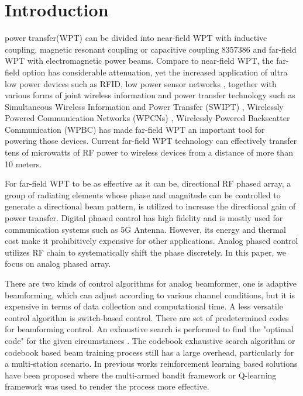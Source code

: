 










\section{Introduction}
 power transfer(WPT) can be divided into near-field WPT with inductive coupling, magnetic resonant coupling or capacitive coupling {8357386} and far-field WPT with electromagnetic power beams. \cite{8246215} Compare to near-field WPT, the far-field option has considerable attenuation,  yet the increased application of ultra low power devices such as RFID, low power sensor networks \cite{7578025}, together with various forms of joint wireless information and power transfer technology such as Simultaneous Wireless Information and Power Transfer (SWIPT) \cite{8214104}, Wirelessly Powered Communication Networks (WPCNs) \cite{7462480}, Wirelessly Powered Backscatter Communication (WPBC) \cite{7842391} has made far-field WPT an important tool for powering those devices. Current far-field WPT technology can effectively transfer tens of microwatts of RF power to wireless devices from a distance of more than 10 meters. \cite{7462480}

For far-field WPT to be as effective as it can be, directional RF phased array, a group of radiating elements whose phase and magnitude can be controlled to generate a directional beam pattern, \cite{665} is utilized to increase the directional gain of power transfer. Digital phased control has high fidelity and is mostly used for communication systems such as 5G Antenna. However, its energy and thermal cost make it prohibitively expensive for other applications. Analog phased control utilizes RF chain to systematically shift the phase discretely. In this paper, we focus on analog phased array.

There are two kinds of control algorithms for analog beamformer, one is adaptive beamforming, which can adjust according to various channel conditions, but it is expensive in terms of data collection and computational time. A less versatile control algorithm is switch-based control. There are set of predetermined codes for beamforming control. An exhaustive search is performed to find the "optimal code" for the given circumstances\cite{5262295} \cite{1237152}. The codebook exhaustive search algorithm or codebook based beam training process still has a large overhead, particularly for a multi-station scenario. In previous works reinforcement learning based solutions have been proposed where the multi-armed bandit framework \cite{8662770} or Q-learning framework \cite{Cui2019SecureWC} was used to render the process more effective.

